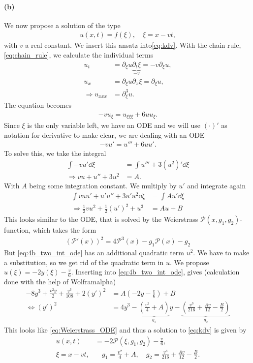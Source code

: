 \paragraph{(b)}
We now propose a solution of the type 
\begin{align}
u(x,t)=f(\xi),\quad \xi= x-vt,
\end{align}
with $v$ a real constant. We insert this ansatz into\cref{eq:kdv}. With the chain rule, \cref{eq:chain_rule}, we calculate the individual terms
\begin{align}
u_t &= \partial_\xi u \underbrace{\partial_t \xi}_{-v}=-v \partial_\xi u,\\
u_x &= \partial_\xi u \partial_x \xi = \partial_\xi u ,\\
\Rightarrow u _{xxx}&= \partial_{\xi}^3 u.
\end{align}
The equation becomes 
\begin{align}
-v u_\xi = u_{\xi\xi\xi} + 6 u u_\xi.
\end{align}
Since $\xi$ is the only variable left, we have an ODE and we  will use $(\cdot)'$ as notation for derivative to make clear, we are dealing with an ODE
\begin{align}
-v u' = u''' +6 uu'.\label{eq:4b_ode}
\end{align}
To solve this, we take the integral
\begin{align}
\int -v u' \dd\xi &= \int u''' +3(u^2)' \dd\xi\\
\Rightarrow v u+u''+3u^2 &= A.
\end{align}
With $A$ being some integration constant.  We multiply by $u'$ and integrate again
\begin{align}
\int vuu' +u'u'' + 3u'u^2 \dd\xi&= \int Au' \dd\xi\\
\Rightarrow \frac 12 vu^2 + \frac 12 (u')^2  + u^3&= Au +B\label{eq:4b_two_int_ode}
\end{align}
This looks similar to the ODE, that is solved by the Weierstrass $\mathscr{P}(x,g_1,g_2)$-function, which takes the form
\begin{align}
(\mathscr{P}'(x))^2 = 4\mathscr{P}^3(x)-g_1\mathscr{P}(x)-g_2 \label{eq:Weierstrass_ODE}
\end{align}
But \cref{eq:4b_two_int_ode} has an additional quadratic term $u^2$.
We have to make a substitution, so we get rid of the quadratic term in $u$.
We propose $u(\xi)=-2y(\xi)-\frac v6$. Inserting into \cref{eq:4b_two_int_ode}, gives (calculation done with the help of Wolframalpha)
\begin{align}
-8y^3+\frac{v^2y}{2}+\frac{v^3}{108} +2(y')^2&=A\left(-2y-\frac v6\right) +B\\
\iff (y')^2 &= 4y^3-\underbrace{\left(\frac{v^2}{4}+A\right)}_{g_1}y - \underbrace{\left(\frac{v^3}{216} +\frac{Av}{12} - \frac B2\right)}_{g_2}
\end{align}
This looks like \cref{eq:Weierstrass_ODE} and thus a solution to \cref{eq:kdv} is given by
\begin{align}
u(x,t) &= -2\mathscr{P}(\xi,g_1,g_2) - \frac v6, \label{eq:sol_4b}\\
\xi = x-vt,& \quad g_1=\frac{v^2}{4}+A, \quad g_2=\frac{v^3}{216} +\frac{Av}{12} - \frac B2.
\end{align}

